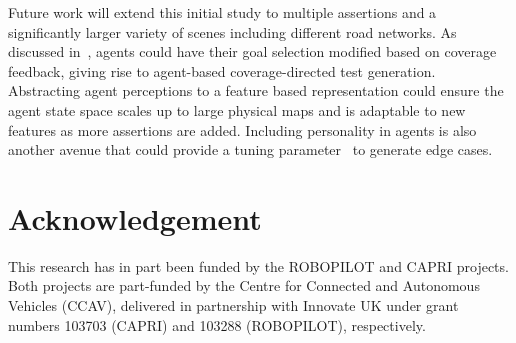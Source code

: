 \documentclass[runningheads,a4paper]{llncs}
\begin{document}
Future work will extend this initial study to multiple assertions and a significantly larger variety of scenes including different road networks. 
As discussed in~\cite{Eder2007}, agents could have their goal selection modified based on coverage feedback, giving rise to  agent-based coverage-directed test generation. Abstracting agent perceptions to a feature based representation could ensure the agent state space scales up to large physical maps and is adaptable to new features as more assertions are added. Including personality in agents is also another avenue that could provide a tuning parameter~\cite{Zoumpoulaki2010} to generate edge cases. 

\section{Acknowledgement}
This research has in part been funded by the ROBOPILOT and CAPRI projects. Both
projects are part-funded by the Centre for Connected and Autonomous
Vehicles (CCAV), delivered in partnership with Innovate UK under grant numbers
103703 (CAPRI) and 103288 (ROBOPILOT), respectively.


\end{document}
